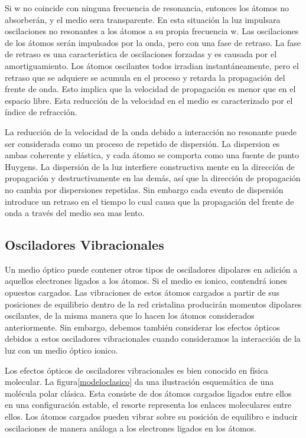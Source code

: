 \documentclass[a4paper,openright,12pt]{book}
\begin{document}
Si w no coincide con ninguna frecuencia de resonancia, entonces los átomos no absorberán, y el medio sera transparente. En esta situación la luz  impulsara oscilaciones no resonantes a los átomos a su propia frecuencia w. Las oscilaciones de los átomos serán impulsados por la onda, pero con una fase de retraso. La fase de retraso es una característica de oscilaciones forzadas y es causada por el amortiguamiento. Los átomos oscilantes todos irradian instantáneamente, pero el retraso que se adquiere se acumula en el proceso y retarda la propagación del frente de onda. Esto implica que la velocidad de propagación es menor que en el espacio libre. Esta reducción de la velocidad en el medio es caracterizado por el índice de refracción.

La reducción de la velocidad de la onda debido a interacción no resonante puede ser considerada como un proceso de repetido de dispersión. La dispersion es ambas coherente y elástica, y cada átomo se comporta como una fuente de punto Huygens. La dispersión de la luz interfiere constructiva mente en la dirección de propagación y destructivamente en las demás, así que la dirección de propagación no cambia por dispersiones repetidas. Sin embargo cada evento de dispersión introduce un retraso en el tiempo lo cual causa que la propagación del frente de onda a través del medio sea mas lento.

\subsection{Osciladores Vibracionales}
Un medio óptico puede contener otros tipos de osciladores dipolares en adición a aquellos electrones ligados a los átomos. Si el medio es ionico, contendrá iones opuestos cargados. Las vibraciones de estos átomos cargados a partir de sus posiciones de equilibrio dentro de la red cristalina producirán momentos dipolares oscilantes, de la misma manera que lo hacen los átomos considerados anteriormente. Sin embargo, debemos también considerar los efectos ópticos debidos a estos osciladores vibracionales cuando consideramos la interacción de la luz con un medio óptico ionico.

Los efectos ópticos de osciladores vibracionales es bien conocido en física molecular. La figura\ref{modeloclasico} da una ilustración esquemática de una molécula polar clásica. Esta consiste de dos átomos cargados ligados entre ellos en una configuración estable, el resorte representa los enlaces moleculares entre ellos. Los átomos cargados pueden vibrar sobre su posición de equilibro e inducir  oscilaciones de manera análoga a los electrones ligados en los átomos. 
\end{document}
